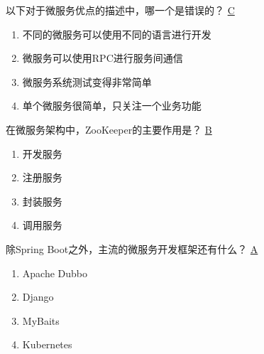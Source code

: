 \begin{problem}
	‌以下对于微服务优点的描述中，哪一个是错误的？
	\uline{C}    
    \vspace{-0.8em}
    \begin{multicols}{2}
        \begin{enumerate}[label=\Alph*.]
            \item 不同的微服务可以使用不同的语言进行开发
            \item 微服务可以使用RPC进行服务间通信
            \item 微服务系统测试变得非常简单
            \item 单个微服务很简单，只关注一个业务功能
        \end{enumerate}
    \end{multicols}
    \vspace{-1em}
\end{problem}



\begin{problem}
	在微服务架构中，ZooKeeper的主要作用是？
	\uline{B}    
    \vspace{-0.8em}
    \begin{multicols}{4}
        \begin{enumerate}[label=\Alph*.]
            \item 开发服务
            \item 注册服务
            \item 封装服务
            \item 调用服务
        \end{enumerate}
    \end{multicols}
    \vspace{-1em}
\end{problem}



\begin{problem}
	除Spring Boot之外，主流的微服务开发框架还有什么？
	\uline{A}    
    \vspace{-0.8em}
    \begin{multicols}{4}
        \begin{enumerate}[label=\Alph*.]
            \item Apache Dubbo
            \item Django
            \item MyBaits
            \item Kubernetes
        \end{enumerate}
    \end{multicols}
    \vspace{-1em}
\end{problem}



